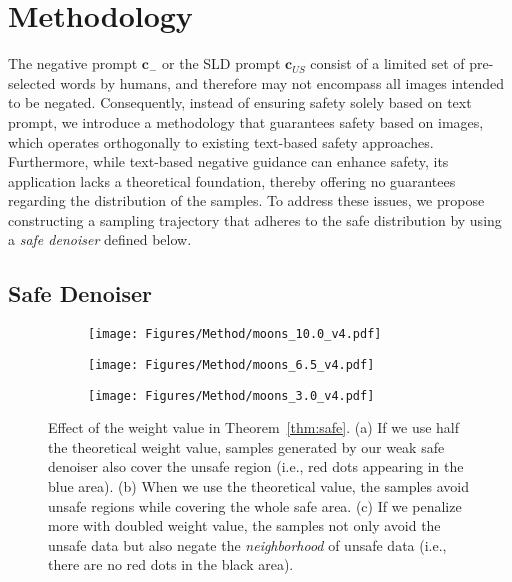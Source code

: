\section{Methodology}
\label{sec_method}

The negative prompt $\mathbf{c}_{-}$ or the SLD prompt $\mathbf{c}_{US}$ consist of a limited set of pre-selected words by humans, and therefore may not encompass all images intended to be negated. Consequently, instead of ensuring safety solely based on text prompt, we introduce a methodology that guarantees safety based on images, which operates orthogonally to existing text-based safety approaches. Furthermore, while text-based negative guidance can enhance safety, its application lacks a theoretical foundation, thereby offering no guarantees regarding the distribution of the samples.
To address these issues, we propose constructing a sampling trajectory that adheres to the safe distribution by using a \textit{safe denoiser} defined below. 

\subsection{Safe Denoiser}\label{sec:safe}


\begin{figure*}[t]%
	\centering
 \begin{subfigure}{0.33\linewidth}
		\centering
		\texttt{[image: Figures/Method/moons\_10.0\_v4.pdf]}
	\end{subfigure}
 \hfil
 \begin{subfigure}{0.33\linewidth}
		\centering
		\texttt{[image: Figures/Method/moons\_6.5\_v4.pdf]}
	\end{subfigure}
 \hfil
 \begin{subfigure}{0.33\linewidth}
		\centering
		\texttt{[image: Figures/Method/moons\_3.0\_v4.pdf]}
	\end{subfigure}
 \vskip -0.05in
	\caption{Effect of the weight value in Theorem~\ref{thm:safe}. (a) If we use half the theoretical weight value, samples generated by our weak safe denoiser also cover the unsafe region (i.e., red dots appearing in the blue area). (b) When we use the theoretical value, the samples avoid unsafe regions while covering the whole safe area. (c) If we penalize more with doubled weight value, the samples not only avoid the unsafe data but also negate the \textit{neighborhood} of unsafe data (i.e., there are no red dots in the black area).}
    \label{fig:beta}
	 \vskip -0.1in
\end{figure*}



